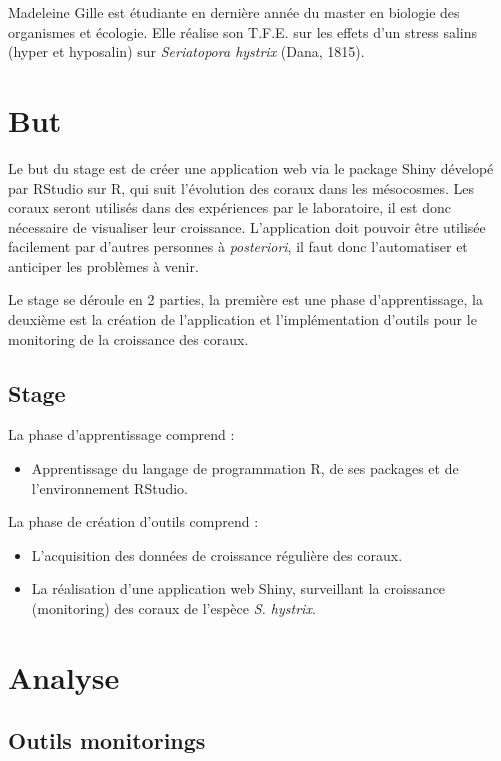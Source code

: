 \documentclass[]{report}
\providecommand{\tightlist}{%
  \setlength{\itemsep}{0pt}\setlength{\parskip}{0pt}}
\begin{document}
Madeleine Gille est étudiante en dernière année du master en biologie
des organismes et écologie. Elle réalise son T.F.E. sur les effets d'un
stress salins (hyper et hyposalin) sur \emph{Seriatopora hystrix} (Dana,
1815).

\chapter{But}\label{but}

Le but du stage est de créer une application web via le package Shiny
dévelopé par RStudio sur R, qui suit l'évolution des coraux dans les
mésocosmes. Les coraux seront utilisés dans des expériences par le
laboratoire, il est donc nécessaire de visualiser leur croissance.
L'application doit pouvoir être utilisée facilement par d'autres
personnes à \emph{posteriori}, il faut donc l'automatiser et anticiper
les problèmes à venir.

Le stage se déroule en 2 parties, la première est une phase
d'apprentissage, la deuxième est la création de l'application et
l'implémentation d'outils pour le monitoring de la croissance des
coraux.

\section{Stage}\label{stage}

La phase d'apprentissage comprend :

\begin{itemize}
\tightlist
\item
  Apprentissage du langage de programmation R, de ses packages et de
  l'environnement RStudio.
\end{itemize}

La phase de création d'outils comprend :

\begin{itemize}
\item
  L'acquisition des données de croissance régulière des coraux.
\item
  La réalisation d'une application web Shiny, surveillant la croissance
  (monitoring) des coraux de l'espèce \emph{S. hystrix}.
\end{itemize}

\chapter{Analyse}\label{analyse}

\section{Outils monitorings}\label{outils-monitorings}
\end{document}
